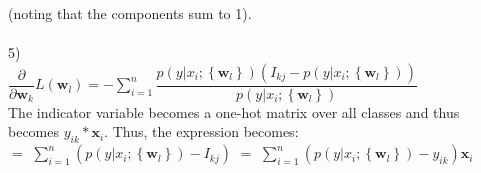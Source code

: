 \documentclass[submit]{harvardml}
\begin{document}
(noting that the components sum to 1).\\
\\
5)\\
$\dfrac{\partial}{\partial \textbf{w}_k}L({\textbf{w}_l}) = -\sum_{i=1}^{n}\dfrac{p(y|x_{i};\left\{ \textbf{w}_l \right\})(I_{kj}-p(y|x_{i};\left\{ \textbf{w}_l \right\}))}{p(y|x_{i};\left\{ \textbf{w}_l \right\})}$\\
The indicator variable becomes a one-hot matrix over all classes and thus becomes $y_{ik}*\textbf{x}_i$.  Thus, the expression becomes:\\

$=$
$\sum_{i=1}^{n}(p(y|x_{i};\left\{ \textbf{w}_l \right\})-I_{kj})$
$=$
$\sum_{i=1}^{n}(p(y|x_{i};\left\{ \textbf{w}_l \right\})-y_{ik})\textbf{x}_i$
\end{document}
